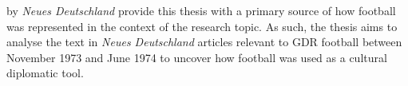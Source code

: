by \textit{Neues Deutschland} provide this thesis with a primary source of how football was represented in the context of the research topic. As such, the thesis aims to analyse the text in \textit{Neues Deutschland} articles relevant to GDR football between November 1973 and June 1974 to uncover how football was used as a cultural diplomatic tool.